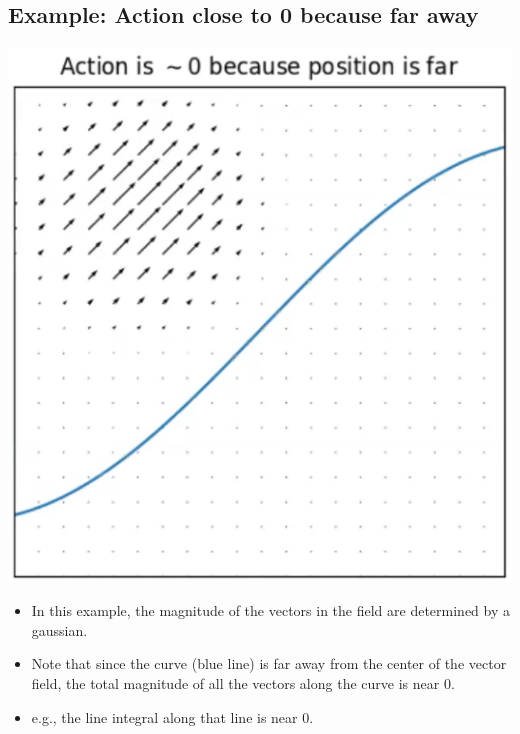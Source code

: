 \documentclass[10pt]{article}
\begin{document}
\subsection*{Example: Action close to 0 because far away}
\begin{center}
    \includegraphics*[scale=0.6]{W3_4.png}
\end{center}
\begin{itemize}
    \item In this example, the magnitude of the vectors in the field are determined by a gaussian.  
    \item Note that since the curve (blue line) is far away from the center of the vector field, the total magnitude of all the vectors along the curve is near 0.
    \item e.g., the line integral along that line is near 0.
\end{itemize}
\end{document}
